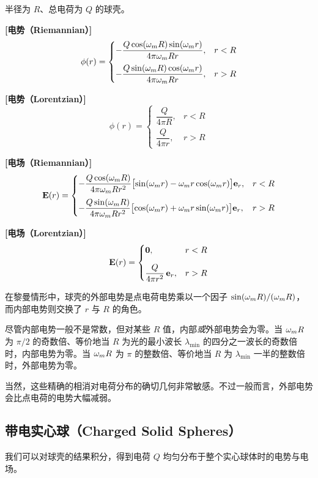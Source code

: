 \begin{keybox}[均匀带电球壳]
半径为 $R$、总电荷为 $Q$ 的球壳。

\textbf{[电势（Riemannian）]}
\[
\phi(r) = \begin{cases}
-\dfrac{Q\cos(\omega_m R)\sin(\omega_m r)}{4\pi\omega_m R r}, & r<R\\[9pt]
-\dfrac{Q\sin(\omega_m R)\cos(\omega_m r)}{4\pi\omega_m R r}, & r>R
\end{cases}
\]

\textbf{[电势（Lorentzian）]}
\[
\phi(r) = \begin{cases}
\dfrac{Q}{4\pi R}, & r<R\\[9pt]
\dfrac{Q}{4\pi r}, & r>R
\end{cases}
\]

\textbf{[电场（Riemannian）]}
\[
\mathbf{E}(r) = \begin{cases}
-\dfrac{Q\cos(\omega_m R)}{4\pi\omega_m R r^{2}}
\bigl[\sin(\omega_m r) - \omega_m r\cos(\omega_m r)\bigr]\mathbf{e}_{r}, & r<R\\[10pt]
-\dfrac{Q\sin(\omega_m R)}{4\pi\omega_m R r^{2}}
\bigl[\cos(\omega_m r) + \omega_m r\sin(\omega_m r)\bigr]\mathbf{e}_{r}, & r>R
\end{cases}
\]

\textbf{[电场（Lorentzian）]}
\[
\mathbf{E}(r) = \begin{cases}
\mathbf{0}, & r<R\\[9pt]
\dfrac{Q}{4\pi r^{2}}\,\mathbf{e}_{r}, & r>R
\end{cases}
\]
\end{keybox}


在黎曼情形中，球壳的外部电势是点电荷电势乘以一个因子 $\sin(\omega_m R)/(\omega_m R)$，而内部电势则交换了 $r$ 与 $R$ 的角色。

尽管内部电势一般不是常数，但对某些 $R$ 值，内部\emph{或}外部电势会为零。当 $\omega_m R$ 为 $\pi/2$ 的奇数倍、等价地当 $R$ 为光的最小波长 $\lambda_{\min}$ 的四分之一波长的奇数倍时，内部电势为零。当 $\omega_m R$ 为 $\pi$ 的整数倍、等价地当 $R$ 为 $\lambda_{\min}$ 一半的整数倍时，外部电势为零。

当然，这些精确的相消对电荷分布的确切几何非常敏感。不过一般而言，外部电势会比点电荷的电势大幅减弱。

\subsection{带电实心球（Charged Solid Spheres）}

我们可以对球壳的结果积分，得到电荷 $Q$ 均匀分布于整个实心球体时的电势与电场。

